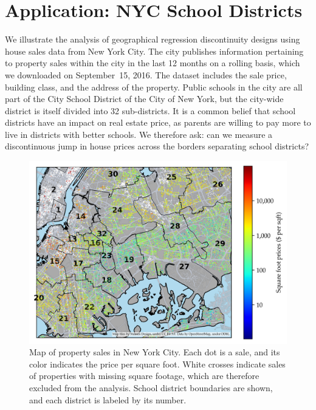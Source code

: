 \documentclass[letter,12pt]{article}
\begin{document}
\hypertarget{application-nyc-school-districts}{%
\section{Application: NYC School Districts}}
\label{sec:NYC_example}

We illustrate the analysis of geographical regression discontinuity designs using house sales data from New York City.
The city publishes information pertaining to property sales within the city in the last 12 months on a rolling basis,
which we downloaded on September~15, 2016.
The dataset includes the sale price, building class, and the address of the property.
Public schools in the city are all part of the City School District of the City of New York, but the city-wide district is itself divided into 32 sub-districts.
It is a common belief that school districts have an impact on real estate price, as parents are willing to pay more to live in districts with better schools.
We therefore ask: can we measure a discontinuous jump in house prices across the borders separating school districts?

\begin{figure}[tb]
    \centering
    \includegraphics[width=\textwidth,height=0.4\textheight,keepaspectratio]{../NYC/NYC_plots/NYC_sales_4.png}
    \caption{\label{fig:sales_map}Map of property sales in New York City. Each dot is a sale, and its color indicates the price per square foot. White crosses indicate sales of properties with missing square footage, which are therefore excluded from the analysis. School district boundaries are shown, and each district is labeled by its number.}
\end{figure}
\end{document}
